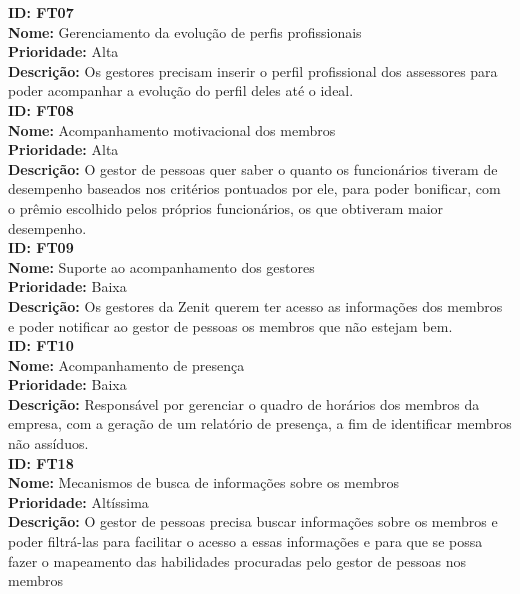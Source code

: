 \begin{anexosenv}
\indent \textbf{ID: FT07}\\
\indent \textbf{Nome:} Gerenciamento da evolução de perfis profissionais\\
\indent \textbf{Prioridade:} Alta\\
\indent \textbf{Descrição:} Os gestores precisam inserir o perfil profissional dos assessores para poder acompanhar a evolução do perfil deles até o ideal.\\

\indent \textbf{ID: FT08}\\
\indent \textbf{Nome:} Acompanhamento motivacional dos membros \\
\indent \textbf{Prioridade:} Alta\\
\indent \textbf{Descrição:} O gestor de pessoas quer saber o quanto os funcionários tiveram de desempenho baseados nos critérios pontuados por ele, para poder bonificar, com o prêmio escolhido pelos próprios funcionários, os que obtiveram maior desempenho.\\

\indent \textbf{ID: FT09}\\
\indent \textbf{Nome:} Suporte ao acompanhamento dos gestores \\
\indent \textbf{Prioridade:} Baixa\\
\indent \textbf{Descrição:} Os gestores da Zenit querem ter acesso as informações dos membros e poder notificar ao gestor de pessoas os membros que não estejam bem.\\

\indent \textbf{ID: FT10}\\
\indent \textbf{Nome:} Acompanhamento de presença\\
\indent \textbf{Prioridade:} Baixa\\
\indent \textbf{Descrição:} Responsável por gerenciar o quadro de horários dos membros da empresa, com a geração de um relatório de presença, a fim de identificar membros não assíduos.\\

\indent \textbf{ID: FT18}\\
\indent \textbf{Nome:} Mecanismos de busca de informações sobre os membros\\
\indent \textbf{Prioridade:} Altíssima\\
\indent \textbf{Descrição:} O gestor de pessoas precisa buscar informações sobre os membros e poder filtrá-las para facilitar o acesso a essas informações e para que se possa fazer o mapeamento das habilidades procuradas pelo gestor de pessoas nos membros\\


\end{anexosenv}
